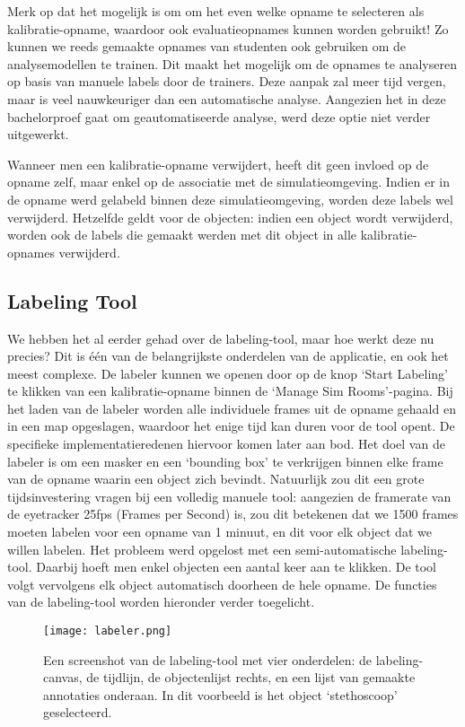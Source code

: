 Merk op dat het mogelijk is om om het even welke opname te selecteren als kalibra\-tie-opname, waardoor ook evaluatieopnames kunnen worden gebruikt!
Zo kunnen we reeds gemaakte opnames van studenten ook gebruiken om de analysemodellen te trainen.
Dit maakt het mogelijk om de opnames te analyseren op basis van manuele labels door de trainers.
Deze aanpak zal meer tijd vergen, maar is veel nauwkeuriger dan een automatische analyse. Aangezien het in deze bachelorproef gaat om geautomatiseerde analyse, werd deze optie niet verder uitgewerkt.

Wanneer men een kalibratie-opname verwijdert, heeft dit geen invloed op de opname zelf, maar enkel op de associatie met de simulatieomgeving.
Indien er in de opname werd gelabeld binnen deze simulatieomgeving, worden deze labels wel verwijderd. 
Hetzelfde geldt voor de objecten: indien een object wordt verwijderd, worden ook de labels die gemaakt werden met dit object in alle kalibratie-opnames verwijderd.

\subsection{Labeling Tool}

We hebben het al eerder gehad over de labeling-tool, maar hoe werkt deze nu precies? Dit is één van de belangrijkste onderdelen van de applicatie, en ook het meest complexe.
De labeler kunnen we openen door op de knop `Start Labeling' te klikken van een kalibratie-opname binnen de `Manage Sim Rooms'-pagina.
Bij het laden van de labeler worden alle individuele frames uit de opname gehaald en in een map opgeslagen, waardoor het enige tijd kan duren voor de tool opent. De specifieke implementatieredenen hiervoor komen later aan bod.
Het doel van de labeler is om een masker en een `bounding box' te verkrijgen binnen elke frame van de opname waarin een object zich bevindt.
Natuurlijk zou dit een grote tijdsinvestering vragen bij een volledig manuele tool: aangezien de framerate van de eyetracker 25fps (Frames per Second) is, zou dit betekenen dat we 1500 frames moeten labelen voor een opname van 1 minuut, en dit voor elk object dat we willen labelen.
Het probleem werd opgelost met een semi-automatische labeling-tool. Daarbij hoeft men enkel objecten een aantal keer aan te klikken. De tool volgt vervolgens elk object automatisch doorheen de hele opname.
De functies van de labeling-tool worden hieronder verder toegelicht.

\begin{figure}[H]
  \centering
  \texttt{[image: labeler.png]}
  \caption[
    Screenshot van de labeling-tool
  ]{\label{fig:labeler} Een screenshot van de labeling-tool met vier onderdelen: de labeling-canvas, de tijdlijn, de objectenlijst rechts, en een lijst van gemaakte annotaties onderaan. In dit voorbeeld is het object `stethoscoop' geselecteerd. }
\end{figure}


